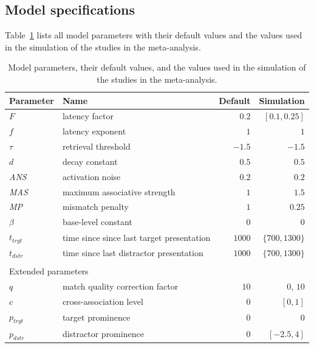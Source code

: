 \documentclass{cambridge7A}\usepackage[]{graphicx}\usepackage[]{color}
\begin{document}
\begin{subappendices}
\clearpage

\section{Model specifications}
\label{sec:modelappendix}
Table~\ref{tbl:params} lists all model parameters with their default values and the values used in the simulation of the studies in the meta-analysis.


\begin{table}[!htbp]
	\caption{Model parameters, their default values, and the values used in the simulation of the studies in the meta-analysis.}
	\begin{center}
	\begin{tabular}{llrr}
	\hline
	Parameter    & Name                                      & Default & Simulation \\
	\hline
	$F$          & latency factor                            & $0.2$ & $[0.1, 0.25]$\\
	$f$          & latency exponent                          & $1$ & $1$ \\
	$\tau$       & retrieval threshold                       & $-1.5$ & $-1.5$ \\ %
	$d$          & decay constant                            & $0.5$ & $0.5$ \\
	\textit{ANS} & activation noise                          & $0.2$ & $0.2$ \\
	\textit{MAS} & maximum associative strength              & $1$ & $1.5$ \\ %
	\textit{MP}  & mismatch penalty                          & $1$ & $0.25$ \\ %
	$\beta$      & base-level constant                       & $0$ & $0$ \\
	$t_{trgt}$   & time since since last target presentation & $1000$ & $\{700, 1300\}$\\
	$t_{dstr}$   & time since last distractor presentation   & $1000$ & $\{700, 1300\}$\\
	{}           &                                           & & \\
 	\multicolumn{3}{l}{Extended parameters} & \\
 	\hline
	$q$          & match quality correction factor           & $10$ & $0$, $10$ \\
	$c$          & cross-association level               		& $0$ & $[0, 1]$ \\
	$p_{trgt}$   & target prominence                         & $0$ & $0$ \\
	$p_{dstr}$   & distractor prominence                     & $0$ & $[-2.5, 4]$\\
 	\hline
	\end{tabular}
	\end{center}
	\label{tbl:params}
\end{table}


\end{subappendices}
\end{document}

